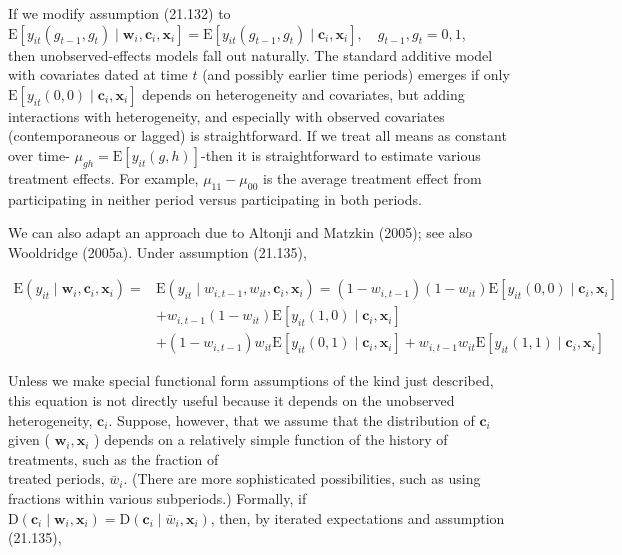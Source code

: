 \documentclass[10pt]{article}
\begin{document}
If we modify assumption (21.132) to\\
$\mathrm{E}\left[y_{i t}\left(g_{t-1}, g_{t}\right) \mid \mathbf{w}_{i}, \mathbf{c}_{i}, \mathbf{x}_{i}\right]=\mathrm{E}\left[y_{i t}\left(g_{t-1}, g_{t}\right) \mid \mathbf{c}_{i}, \mathbf{x}_{i}\right], \quad g_{t-1}, g_{t}=0,1$,\\
then unobserved-effects models fall out naturally. The standard additive model with covariates dated at time $t$ (and possibly earlier time periods) emerges if only $\mathrm{E}\left[y_{i t}(0,0) \mid \mathbf{c}_{i}, \mathbf{x}_{i}\right]$ depends on heterogeneity and covariates, but adding interactions with heterogeneity, and especially with observed covariates (contemporaneous or lagged) is straightforward. If we treat all means as constant over time- $\mu_{g h}= \mathrm{E}\left[y_{i t}(g, h)\right]$-then it is straightforward to estimate various treatment effects. For example, $\mu_{11}-\mu_{00}$ is the average treatment effect from participating in neither period versus participating in both periods.

We can also adapt an approach due to Altonji and Matzkin (2005); see also Wooldridge (2005a). Under assumption (21.135),

$$
\begin{aligned}
\mathrm{E}\left(y_{i t} \mid \mathbf{w}_{i}, \mathbf{c}_{i}, \mathbf{x}_{i}\right)= & \mathrm{E}\left(y_{i t} \mid w_{i, t-1}, w_{i t}, \mathbf{c}_{i}, \mathbf{x}_{i}\right)=\left(1-w_{i, t-1}\right)\left(1-w_{i t}\right) \mathrm{E}\left[y_{i t}(0,0) \mid \mathbf{c}_{i}, \mathbf{x}_{i}\right] \\
& +w_{i, t-1}\left(1-w_{i t}\right) \mathrm{E}\left[y_{i t}(1,0) \mid \mathbf{c}_{i}, \mathbf{x}_{i}\right] \\
& +\left(1-w_{i, t-1}\right) w_{i t} \mathrm{E}\left[y_{i t}(0,1) \mid \mathbf{c}_{i}, \mathbf{x}_{i}\right]+w_{i, t-1} w_{i t} \mathrm{E}\left[y_{i t}(1,1) \mid \mathbf{c}_{i}, \mathbf{x}_{i}\right]
\end{aligned}
$$

Unless we make special functional form assumptions of the kind just described, this equation is not directly useful because it depends on the unobserved heterogeneity, $\mathbf{c}_{i}$. Suppose, however, that we assume that the distribution of $\mathbf{c}_{i}$ given ( $\mathbf{w}_{i}, \mathbf{x}_{i}$ ) depends on a relatively simple function of the history of treatments, such as the fraction of\\
treated periods, $\bar{w}_{i}$. (There are more sophisticated possibilities, such as using fractions within various subperiods.) Formally, if $\mathrm{D}\left(\mathbf{c}_{i} \mid \mathbf{w}_{i}, \mathbf{x}_{i}\right)=\mathrm{D}\left(\mathbf{c}_{i} \mid \bar{w}_{i}, \mathbf{x}_{i}\right)$, then, by iterated expectations and assumption (21.135),
\end{document}
